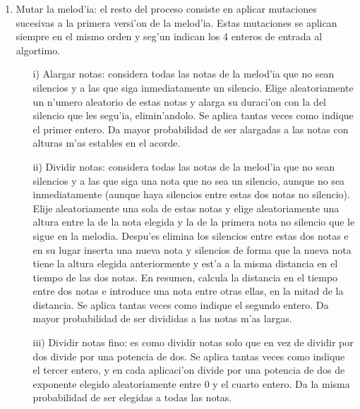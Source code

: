 \begin{enumerate}
        \item Mutar la melod'ia: el resto del proceso consiste en aplicar mutaciones sucesivas a la primera versi'on de la melod'ia. Estas mutaciones se aplican siempre en el mismo orden y seg'un indican los 4 enteros de entrada al algortimo.
                \begin{enumerate}
                \item[i)] Alargar notas: considera todas las notas de la melod'ia que no sean silencios y a las que siga inmediatamente un silencio. Elige aleatoriamente un n'umero aleatorio de estas notas y alarga su duraci'on con la del silencio que les segu'ia, elimin'andolo. Se aplica tantas veces como indique el primer entero. Da mayor probabilidad de ser alargadas a las notas con alturas m'as estables en el acorde.
                \item[ii)] Dividir notas: considera todas las notas de la melod'ia que no sean silencios y a las que siga una nota que no sea un silencio, aunque no sea inmediatamente (aunque haya silencios entre estas dos notas no silencio). Elije aleatoriamente una sola de estas notas y elige aleatoriamente una altura entre la de la nota elegida y la de la primera nota no silencio que le sigue en la melodia. Despu'es elimina los silencios entre estas dos notas e en su lugar inserta una nueva nota y silencios de forma que la nueva nota tiene la altura elegida anteriormente y est'a a la misma distancia en el tiempo de las dos notas. En resumen, calcula la distancia en el tiempo entre dos notas e introduce una nota entre otras ellas, en la mitad de la distancia. Se aplica tantas veces como indique el segundo entero. Da mayor probabilidad de ser divididas a las notas m'as largas.
                \item[iii)] Dividir notas fino: es como dividir notas solo que en vez de dividir por dos divide por una potencia de dos. Se aplica tantas veces como indique el tercer entero, y en cada aplicaci'on divide por una potencia de dos de exponente elegido aleatoriamente entre 0 y el cuarto entero. Da la misma probabilidad de ser elegidas a todas las notas.
                \end{enumerate}
        \end{enumerate}

